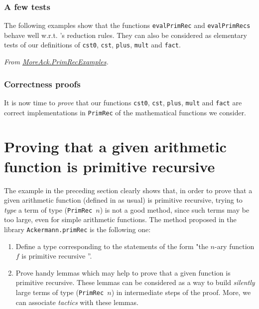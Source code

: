 



\subsubsection{A few tests}

The following examples show that the functions 
\texttt{evalPrimRec} and \texttt{evalPrimRecs}
 behave well w.r.t. 
\coq's reduction rules. They can also be considered as 
elementary tests of our definitions of \texttt{cst0}, \texttt{cst},
\texttt{plus}, \texttt{mult} and \texttt{fact}.

\vspace{4pt}
\noindent
\emph{From \href{../theories/html/hydras.MoreAck.PrimRecExamples.html}{MoreAck.PrimRecExamples}.}



\vspace{4pt}
\noindent

\subsubsection{Correctness proofs}

It is now time to \emph{prove} that our functions \texttt{cst0},
\texttt{cst}, \texttt{plus}, \texttt{mult} and \texttt{fact} are correct implementations in \texttt{PrimRec} of the mathematical functions we
consider.

 


\section{Proving that a given \coq arithmetic function is primitive recursive}
\label{sect:proofs-of-isPR}

The example in the preceding section clearly shows that, in order to prove that a given arithmetic function
(defined in \gallina{} as usual) is primitive recursive, trying to \emph{type} a term  of type (\texttt{PrimRec $n$}) is not a good method, since such terms may be too large, even for simple arithmetic functions. The method proposed in the library \texttt{Ackermann.primRec} is the following one:

\begin{enumerate}
\item Define a type corresponding to the statements of the form  "the $n$-ary function $f$ is primitive recursive ''.
\item Prove handy lemmas which may help to prove that a given function is primitive recursive. These lemmas can be considered as a way to build \emph{silently} large terms of 
type (\texttt{PrimRec $n$}) in intermediate steps of the proof.
More, we can associate \emph{tactics} with these lemmas.

\end{enumerate}


